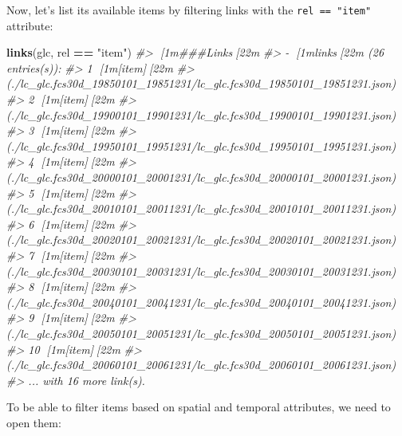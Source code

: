 \documentclass[
  graybox,natbib,nospthms]{svmono}
\newenvironment{Shaded}{\begin{snugshade}}{\end{snugshade}}
\newcommand{\CommentTok}[1]{\textcolor[rgb]{0.37,0.37,0.37}{\textit{#1}}}
\newcommand{\FunctionTok}[1]{\textcolor[rgb]{0.27,0.27,0.27}{\textbf{#1}}}
\newcommand{\NormalTok}[1]{#1}
\newcommand{\SpecialCharTok}[1]{\textcolor[rgb]{0.43,0.43,0.43}{\textbf{#1}}}
\newcommand{\StringTok}[1]{\textcolor[rgb]{0.5,0.5,0.5}{#1}}
\begin{document}
Now, let's list its available items by filtering links with the \texttt{rel\ ==\ "item"} attribute:

\begin{Shaded}
\begin{Highlighting}[]
\FunctionTok{links}\NormalTok{(glc, rel }\SpecialCharTok{==} \StringTok{"item"}\NormalTok{)}
\CommentTok{\#\textgreater{} [1m\#\#\#Links[22m}
\CommentTok{\#\textgreater{} {-} [1mlinks[22m (26 entries(s)):}
\CommentTok{\#\textgreater{}  1 [1m[item][22m }
\CommentTok{\#\textgreater{} (./lc\_glc.fcs30d\_19850101\_19851231/lc\_glc.fcs30d\_19850101\_19851231.json)}
\CommentTok{\#\textgreater{}  2 [1m[item][22m }
\CommentTok{\#\textgreater{} (./lc\_glc.fcs30d\_19900101\_19901231/lc\_glc.fcs30d\_19900101\_19901231.json)}
\CommentTok{\#\textgreater{}  3 [1m[item][22m }
\CommentTok{\#\textgreater{} (./lc\_glc.fcs30d\_19950101\_19951231/lc\_glc.fcs30d\_19950101\_19951231.json)}
\CommentTok{\#\textgreater{}  4 [1m[item][22m }
\CommentTok{\#\textgreater{} (./lc\_glc.fcs30d\_20000101\_20001231/lc\_glc.fcs30d\_20000101\_20001231.json)}
\CommentTok{\#\textgreater{}  5 [1m[item][22m }
\CommentTok{\#\textgreater{} (./lc\_glc.fcs30d\_20010101\_20011231/lc\_glc.fcs30d\_20010101\_20011231.json)}
\CommentTok{\#\textgreater{}  6 [1m[item][22m }
\CommentTok{\#\textgreater{} (./lc\_glc.fcs30d\_20020101\_20021231/lc\_glc.fcs30d\_20020101\_20021231.json)}
\CommentTok{\#\textgreater{}  7 [1m[item][22m }
\CommentTok{\#\textgreater{} (./lc\_glc.fcs30d\_20030101\_20031231/lc\_glc.fcs30d\_20030101\_20031231.json)}
\CommentTok{\#\textgreater{}  8 [1m[item][22m }
\CommentTok{\#\textgreater{} (./lc\_glc.fcs30d\_20040101\_20041231/lc\_glc.fcs30d\_20040101\_20041231.json)}
\CommentTok{\#\textgreater{}  9 [1m[item][22m }
\CommentTok{\#\textgreater{} (./lc\_glc.fcs30d\_20050101\_20051231/lc\_glc.fcs30d\_20050101\_20051231.json)}
\CommentTok{\#\textgreater{} 10 [1m[item][22m }
\CommentTok{\#\textgreater{} (./lc\_glc.fcs30d\_20060101\_20061231/lc\_glc.fcs30d\_20060101\_20061231.json)}
\CommentTok{\#\textgreater{}   ... with 16 more link(s).}
\end{Highlighting}
\end{Shaded}

To be able to filter items based on spatial and temporal attributes, we need to open them:
\end{document}

